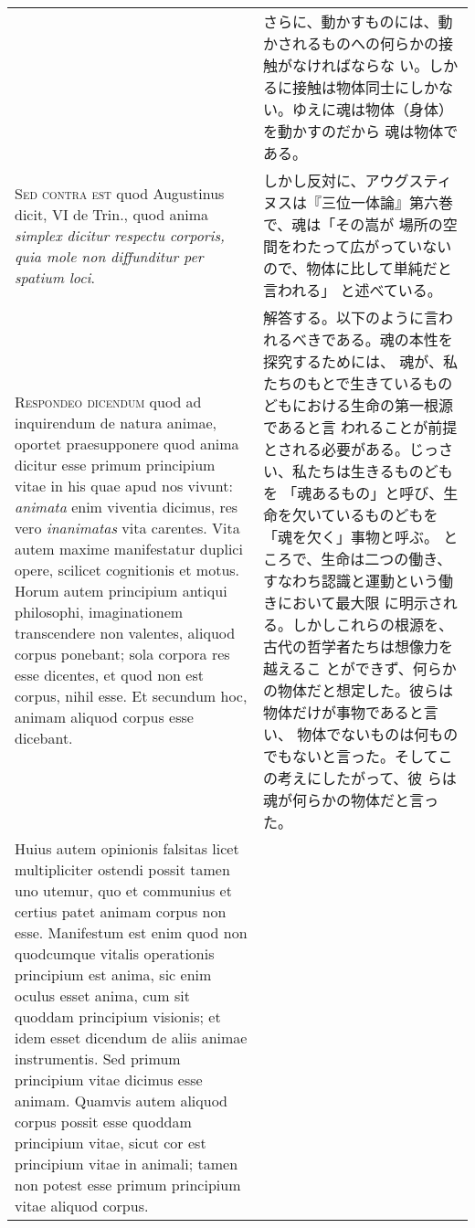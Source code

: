 \documentclass[10pt]{jsarticle} %
\begin{document}
\begin{longtable}{p{21em}p{21em}}
&

さらに、動かすものには、動かされるものへの何らかの接触がなければならな
い。しかるに接触は物体同士にしかない。ゆえに魂は物体（身体）を動かすのだから
魂は物体である。

\\


{\scshape Sed contra est} quod Augustinus dicit, VI de Trin., quod anima {\itshape simplex
 dicitur respectu corporis, quia mole non diffunditur per spatium
 loci}.


&

しかし反対に、アウグスティヌスは『三位一体論』第六巻で、魂は「その嵩が
場所の空間をわたって広がっていないので、物体に比して単純だと言われる」
と述べている。

\\



{\scshape Respondeo dicendum} quod ad inquirendum de natura animae, oportet
praesupponere quod anima dicitur esse primum principium vitae in his
quae apud nos vivunt: {\itshape animata} enim viventia dicimus, res vero
{\itshape inanimatas} vita carentes. Vita autem maxime manifestatur duplici
opere, scilicet cognitionis et motus. Horum autem principium antiqui
philosophi, imaginationem transcendere non valentes, aliquod corpus
ponebant; sola corpora res esse dicentes, et quod non est corpus,
nihil esse. Et secundum hoc, animam aliquod corpus esse
dicebant. 


&

解答する。以下のように言われるべきである。魂の本性を探究するためには、
魂が、私たちのもとで生きているものどもにおける生命の第一根源であると言
われることが前提とされる必要がある。じっさい、私たちは生きるものどもを
「魂あるもの」と呼び、生命を欠いているものどもを「魂を欠く」事物と呼ぶ。
ところで、生命は二つの働き、すなわち認識と運動という働きにおいて最大限
に明示される。しかしこれらの根源を、古代の哲学者たちは想像力を越えるこ
とができず、何らかの物体だと想定した。彼らは物体だけが事物であると言い、
物体でないものは何ものでもないと言った。そしてこの考えにしたがって、彼
らは魂が何らかの物体だと言った。

\\



Huius autem opinionis falsitas licet multipliciter ostendi
possit tamen uno utemur, quo et communius et certius patet animam
corpus non esse. Manifestum est enim quod non quodcumque vitalis
operationis principium est anima, sic enim oculus esset anima, cum sit
quoddam principium visionis; et idem esset dicendum de aliis animae
instrumentis. Sed primum principium vitae dicimus esse animam. Quamvis
autem aliquod corpus possit esse quoddam principium vitae, sicut cor
est principium vitae in animali; tamen non potest esse primum
principium vitae aliquod corpus. 



\end{longtable}
\end{document}
